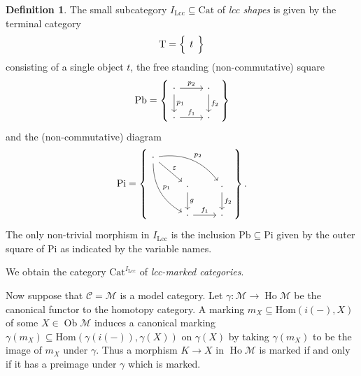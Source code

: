 \documentclass[a4paper]{article}
\theoremstyle{remark}
\theoremstyle{definition}
\newtheorem{definition}[theorem]{Definition}
\begin{document}
\begin{definition}
  The small subcategory $I_\mathrm{Lcc} \subseteq \mathrm{Cat}$ of \emph{lcc shapes} is given by the terminal category 
  \begin{equation}
    \mathrm{T} =
    \left\{
      \begin{tikzcd}
        t
      \end{tikzcd}
    \right\}
  \end{equation}
  consisting of a single object $t$, the free standing (non-commutative) square
  \begin{equation}
    \mathrm{Pb} =
    \left\{
      \begin{tikzcd}
        \cdot \arrow[d, "p_1"] \arrow[r, "p_2"] & \cdot \arrow[d, "f_2"] \\
        \cdot \arrow[r, "f_1"] & \cdot
      \end{tikzcd}
    \right\}
  \end{equation}
  and the (non-commutative) diagram
  \begin{equation}
    \mathrm{Pi} =
    \left\{
      \begin{tikzcd}
        \cdot \arrow[ddr, bend right, "p_1"] \arrow[drr, bend left, "p_2"] \arrow[dr, "\varepsilon"] \\
        & \cdot \arrow[d, "g"] & \cdot \arrow[d, "f_2"] \\
        & \cdot \arrow[r, "f_1"] & \cdot
      \end{tikzcd}
    \right\}.
  \end{equation}
  The only non-trivial morphism in $I_\mathrm{Lcc}$ is the inclusion $\mathrm{Pb} \subseteq \mathrm{Pi}$ given by the outer square of $\mathrm{Pi}$ as indicated by the variable names.

  We obtain the category $\mathrm{Cat}^{I_\mathrm{Lcc}}$ of \emph{lcc-marked categories}.
\end{definition}

Now suppose that $\mathcal{C} = \mathcal{M}$ is a model category.
Let $\gamma : \mathcal{M} \rightarrow \operatorname{Ho} \mathcal{M}$ be the canonical functor to the homotopy category.
A marking $m_X \subseteq \mathrm{Hom}(i(-), X)$ of some $X \in \operatorname{Ob} \mathcal{M}$ induces a canonical marking $\gamma(m_X) \subseteq \mathrm{Hom}(\gamma(i(-)), \gamma(X))$ on $\gamma(X)$ by taking $\gamma(m_X)$ to be the image of $m_X$ under $\gamma$.
Thus a morphism $K \rightarrow X$ in $\operatorname{Ho} \mathcal{M}$ is marked if and only if it has a preimage under $\gamma$ which is marked.
\end{document}
